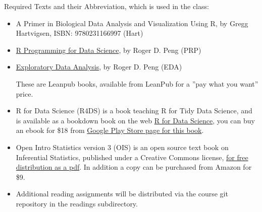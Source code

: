 \documentclass[11pt]{article} %
\begin{document}
  Required Texts and their Abbreviation, which is used in the class:
  \begin{itemize}
 
    \item A Primer in Biological Data Analysis and Visualization Using R, by Gregg Hartvigsen, ISBN: 9780231166997 (Hart)
  
    \item \href{https://leanpub.com/rprogramming}{R Programming for Data Science}, by Roger D. Peng (PRP)
  
    \item \href{https://leanpub.com/exdata}{Exploratory Data Analysis}, by Roger D. Peng (EDA) 
  
  These are  Leanpub books, available from LeanPub for a ”pay what you want” price. 
  
    \item R for Data Science (R4DS) is a book teaching R for Tidy Data Science, and is available as a bookdown book on the web \href{http://r4ds.had.co.nz/}{R for Data Science}, you can buy an ebook for \$18 from \href{https://play.google.com/store/books/details/Hadley_Wickham_R_for_Data_Science?id=I6y3DQAAQBAJ}{Google Play Store page for this book}. 
  
    \item Open Intro Statistics version 3 (OIS) is an open source text book on Inferential Statistics, published under a Creative Commons license, \href{https://drive.google.com/file/d/0B-DHaDEbiOGkc1RycUtIcUtIelE/view}{for free distribution as a pdf}. In addition a copy can be purchased from Amazon for \$9. 
  
    \item Additional reading assignments will be distributed via the course git repository in the readings subdirectory. 
  \end{itemize}

\FloatBarrier
\end{document}
